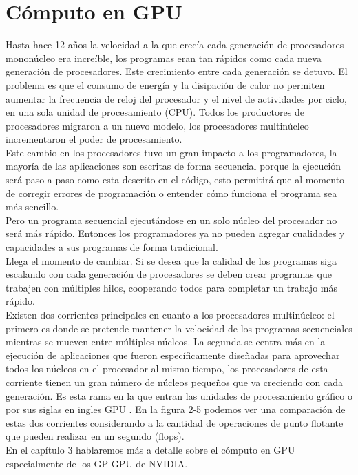 \section {Cómputo en GPU}
Hasta hace 12 años la velocidad a la que crecía cada generación de procesadores mononúcleo era increíble, los programas eran tan rápidos como cada nueva generación de procesadores. Este crecimiento entre cada generación se detuvo. El problema es que el consumo de energía y la disipación de calor no permiten aumentar la frecuencia de reloj del procesador y el nivel de actividades por ciclo, en una sola unidad de procesamiento (CPU). Todos los productores de procesadores migraron a un nuevo modelo, los procesadores multinúcleo incrementaron el poder de procesamiento.\\
Este cambio en los procesadores tuvo un gran impacto a los programadores, la mayoría de las aplicaciones son escritas de forma secuencial porque la ejecución será paso a paso como esta descrito en el código, esto permitirá que al momento de corregir errores de programación o entender cómo funciona el programa sea más sencillo. \\
Pero un programa secuencial ejecutándose en un solo núcleo del procesador no será más rápido. Entonces los programadores ya no pueden agregar cualidades y capacidades a sus programas de forma tradicional.\\
Llega el momento de cambiar. Si se desea que la calidad de los programas siga escalando con cada generación de procesadores se deben crear programas que trabajen con múltiples hilos, cooperando todos para completar un trabajo más rápido.\\
Existen dos corrientes principales en cuanto a los procesadores multinúcleo: el primero es donde se pretende mantener la velocidad de los programas secuenciales mientras se mueven entre múltiples núcleos. La segunda se centra más en la ejecución de aplicaciones que fueron específicamente diseñadas para aprovechar todos los núcleos en el procesador al mismo tiempo, los procesadores de esta corriente tienen un gran número de núcleos pequeños que va creciendo con cada generación. Es esta rama en la que entran las unidades de procesamiento gráfico o por sus siglas en ingles GPU \cite{Kirk2010}. En la figura 2-5 podemos ver una comparación de estas dos corrientes considerando a la cantidad de operaciones de punto flotante que pueden realizar en un segundo (flops).\\
En el capítulo 3 hablaremos más a detalle sobre el cómputo en GPU especialmente de los GP-GPU de NVIDIA.\\
